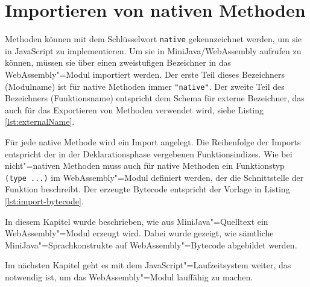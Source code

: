 \section{Importieren von nativen Methoden}

Methoden können mit dem Schlüsselwort \lstinline{native} gekennzeichnet werden, um sie in JavaScript zu implementieren. Um sie in MiniJava/WebAssembly aufrufen zu können, müssen sie über einen zweistufigen Bezeichner in das WebAssembly"=Modul importiert werden. Der erste Teil dieses Bezeichners (Modulname) ist für native Methoden immer \lstinline{"native"}. Der zweite Teil des Bezeichners (Funktionsname) entspricht dem Schema für externe Bezeichner, das auch für das Exportieren von Methoden verwendet wird, siehe Listing \ref{lst:externalName}.

\pagebreak
Für jede native Methode wird ein Import angelegt. Die Reihenfolge der Imports entspricht der in der Deklarationsphase vergebenen Funktionsindizes. Wie bei nicht"=nativen Methoden muss auch für native Methoden ein Funktionstyp \lstinline{(type ...)} im WebAssembly"=Modul definiert werden, der die Schnittstelle der Funktion beschreibt. Der erzeugte Bytecode entspricht der Vorlage in Listing \ref{lst:import-bytecode}.



\vspace{4em}
In diesem Kapitel wurde beschrieben, wie aus MiniJava"=Quelltext ein WebAssembly"=Modul erzeugt wird. Dabei wurde gezeigt, wie sämtliche MiniJava"=Sprachkonstrukte auf WebAssembly"=Bytecode abgebildet werden.

Im nächsten Kapitel geht es mit dem JavaScript"=Laufzeitsystem weiter, das notwendig ist, um das WebAssembly"=Modul lauffähig zu machen.
